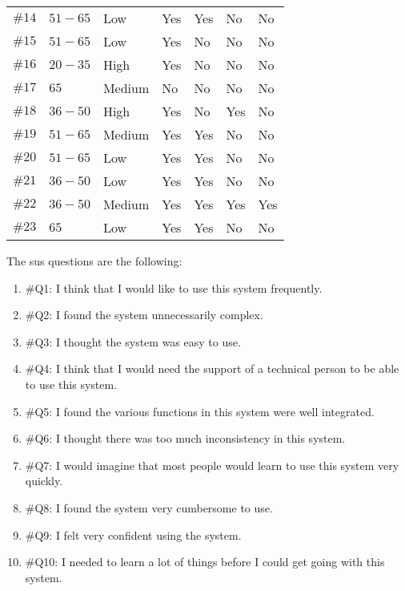 \begin{table}
\begin{tabular}{r l l l l l l}
  $\#14$ & $51-65$ 	     & Low		   & Yes		      & Yes			   & No			& No	\\
  $\#15$ & $51-65$ 	     & Low		   & Yes		      & No			   & No			& No	\\
  $\#16$ & $20-35$ 	     & High		   & Yes		      & No			   & No			& No	\\
  $\#17$ & $65$ 	     & Medium		   & No			      & No			   & No			& No	\\
  $\#18$ & $36-50$ 	     & High		   & Yes		      & No			   & Yes		& No	\\
  $\#19$ & $51-65$ 	     & Medium		   & Yes		      & Yes			   & No			& No	\\
  $\#20$ & $51-65$ 	     & Low		   & Yes		      & Yes			   & No			& No	\\
  $\#21$ & $36-50$ 	     & Low		   & Yes		      & Yes			   & No			& No	\\
  $\#22$ & $36-50$ 	     & Medium		   & Yes		      & Yes			   & Yes		& Yes	\\
  $\#23$ & $65$	 	     & Low		   & Yes		      & Yes			   & No			& No	\\
  \hline
\end{tabular}
\end{table}

The \ac{sus} questions are the following:
\begin{enumerate}
  \item \#Q1: I think that I would like to use this system frequently.
  \item \#Q2: I found the system unnecessarily complex.
  \item \#Q3: I thought the system was easy to use.
  \item \#Q4: I think that I would need the support of a technical person to be 
  able to use this system.
  \item \#Q5: I found the various functions in this system were well integrated.
  \item \#Q6: I thought there was too much inconsistency in this system.
  \item \#Q7: I would imagine that most people would learn to use this system 
  very quickly.
  \item \#Q8: I found the system very cumbersome to use.
  \item \#Q9: I felt very confident using the system.
  \item \#Q10: I needed to learn a lot of things before I could get going with 
  this system.
\end{enumerate}

